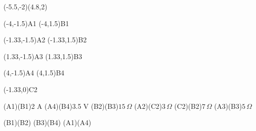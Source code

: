 \pspicture*(-5.5,-2)(4.8,2)


\pnode(-4,-1.5){A1}
\pnode(-4,1.5){B1}

\pnode(-1.33,-1.5){A2}
\pnode(-1.33,1.5){B2}

\pnode(1.33,-1.5){A3}
\pnode(1.33,1.5){B3}

\pnode(4,-1.5){A4}
\pnode(4,1.5){B4}

\pnode(-1.33,0){C2}

\Ucc[labelInside=1,labeloffset=9mm,arrowscale=1.5 1.5,arrowinset=0](A1)(B1){2 A}
\Ucc[labelInside=2,labeloffset=11mm](A4)(B4){3.5 V}
\resistor[intensity,
intensitylabel=$I$,
intensitylabeloffset=3mm,
arrowscale=2 2,
labeloffset=-5mm](B2)(B3){$15\,\Omega$}
\resistor[labeloffset=7mm](A2)(C2){$3\,\Omega$}
\resistor[labeloffset=7mm](C2)(B2){$7\,\Omega$}
\resistor[labeloffset=7mm](A3)(B3){$5\,\Omega$}

\wire(B1)(B2)		
\wire(B3)(B4)
\wire(A1)(A4)

\endpspicture